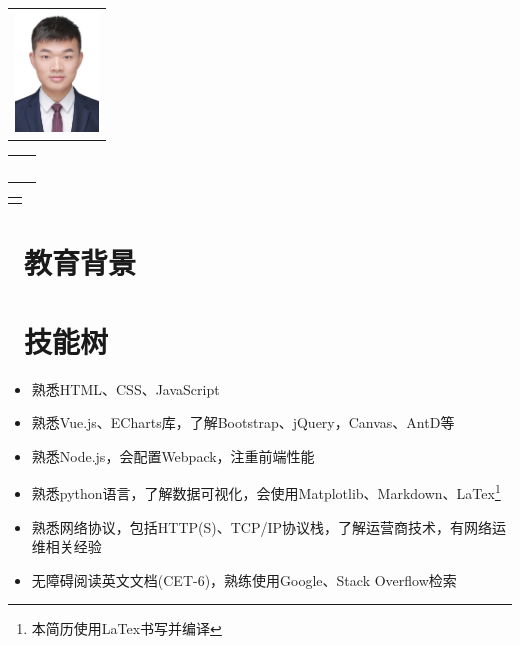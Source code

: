 \documentclass[14pt]{resume}
\begin{document}

\begin{multicols}{4}
    \Large{
        \begin{tabu}{ r }
        \end{tabu}
    }
    \columnbreak
    \Large{
        \begin{tabu}{ l l }
            &  \\
            &  \\
            &  \\
            &  \\
            &  
        \end{tabu}
    }
    \columnbreak
    \Large{
        \begin{tabu}{ r }
        \end{tabu}
    }
\end{multicols}

\section{\faGraduationCap\  教育背景}

\section{\faCogs\ 技能树}

\begin{itemize}
    \item[\faTree] 熟悉HTML、CSS、JavaScript
    \item[\faTree] 熟悉Vue.js、ECharts库，了解Bootstrap、jQuery，Canvas、AntD等
    \item[\faTree] 熟悉Node.js，会配置Webpack，注重前端性能
    \item[\faTree] 熟悉python语言，了解数据可视化，会使用Matplotlib、Markdown、LaTex\footnote{本简历使用LaTex书写并编译}
    \item[\faTree] 熟悉网络协议，包括HTTP(S)、TCP/IP协议栈，了解运营商技术，有网络运维相关经验
    \item[\faTree] 无障碍阅读英文文档(CET-6)，熟练使用Google、Stack Overflow检索
\end{itemize}
\end{document}
